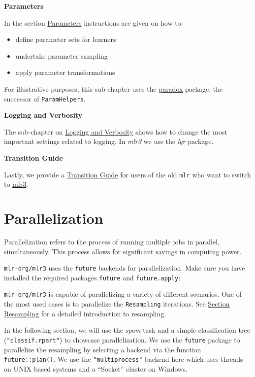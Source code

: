 \documentclass[
  11pt,
  parskip=half,
  DIV=calc,
  BCOR=10mm,
  x11names]{scrbook}
\providecommand{\tightlist}{%
  \setlength{\itemsep}{0pt}\setlength{\parskip}{0pt}}
\begin{document}
\textbf{Parameters}

In the section \protect\hyperlink{paradox}{Parameters} instructions are given on how to:

\begin{itemize}
\tightlist
\item
  define parameter sets for learners
\item
  undertake parameter sampling
\item
  apply parameter transformations
\end{itemize}

For illustrative purposes, this sub-chapter uses the \href{https://paradox.mlr-org.com}{paradox} package, the successor of \texttt{ParamHelpers}.

\textbf{Logging and Verbosity}

The sub-chapter on \protect\hyperlink{logging}{Logging and Verbosity} shows how to change the most important settings related to logging.
In \emph{mlr3} we use the \emph{lgr} package.

\textbf{Transition Guide}

Lastly, we provide a \protect\hyperlink{transition}{Transition Guide} for users of the old \texttt{mlr} who want to switch to \href{https://mlr3.mlr-org.com}{mlr3}.

\hypertarget{parallelization}{%
\section{Parallelization}\label{parallelization}}

Parallelization refers to the process of running multiple jobs in parallel, simultaneously.
This process allows for significant savings in computing power.

\texttt{mlr-org/mlr3} uses the \texttt{future} backends for parallelization.
Make sure you have installed the required packages \texttt{future} and \texttt{future.apply}:

\texttt{mlr-org/mlr3} is capable of parallelizing a variety of different scenarios.
One of the most used cases is to parallelize the \texttt{Resampling} iterations.
See \protect\hyperlink{resampling}{Section Resampling} for a detailed introduction to resampling.

In the following section, we will use the \emph{spam} task and a simple classification tree (\texttt{"classif.rpart"}) to showcase parallelization.
We use the \texttt{future} package to parallelize the resampling by selecting a backend via the function \texttt{future::plan()}.
We use the \texttt{"multiprocess"} backend here which uses threads on UNIX based systems and a ``Socket'' cluster on Windows.
\end{document}
